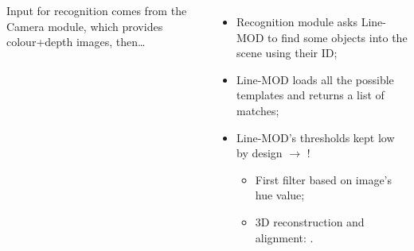 \documentclass{beamer}
\begin{document}
\begin{frame}
\begin{columns}

    Input for recognition comes from the Camera module, which provides
    colour+depth images, then\dots

    \begin{itemize}
      \pause
      \item{Recognition module asks Line-MOD to find some objects into
      the scene using their ID;}
      \pause
      \item{Line-MOD loads all the possible templates and returns a
        list of matches;}
      \pause
      \item{Line-MOD's thresholds kept low by design $\rightarrow$ !}
        \pause
        \begin{itemize}
        \item{First filter based on image's hue value;}
          \item{3D reconstruction and alignment: .}
        \end{itemize}
    \end{itemize} 
    \end{columns}
  \end{frame}
\end{document}
